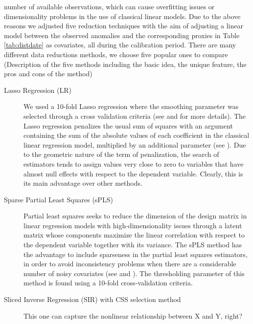 \documentclass[11pt]{amsart}
\theoremstyle{plain}
\theoremstyle{definition}
\theoremstyle{remark}
\begin{document}
number of available observations, which can cause overfitting issues or
dimensionality problems in the use of classical linear models. Due to the above
reasons we adjusted five reduction techniques with the aim of adjusting
a linear model between the observed anomalies and the corresponding proxies in
Table \ref{tab:distdate} as covariates, all during the calibration
period. There are many different data reductions methods, we choose five popular ones to compare (Description of the five methods including the basic idea, the unique feature, the pros and cons of the method)
\begin{description}
\item[Lasso Regression (LR)]
We used a 10-fold Lasso regression where the smoothing parameter was selected
through a cross validation criteria (see \cite{Tibshirani1996} and \cite{Friedman2010} for more details). %
 The Lasso regression penalizes the usual sum of squares with an argument
 containing the sum of the absolute values of each coefficient in the classical
 linear regression model, multiplied by an additional parameter (see \cite{Tibshirani1996}). Due
 to the geometric nature of the term of penalization, the search of estimators
 tends to assign values very close to zero to variables that have almost null
 effects with respect to the dependent variable. Clearly, this is its main advantage
 over other methods.
\item[Sparse Partial Least Squares (sPLS)] 
  Partial least squares seeks to reduce the dimension of the design matrix in
  linear regression models with high-dimensionality issues through a latent matrix
  whose components maximize the linear correlation with respect to the
  dependent variable together with its variance. The sPLS method has the advantage to include sparseness in the partial least squares
  estimators, in order to avoid inconsistency problems when there are a
  considerable number of noisy covariates (see \cite{Chun2010} and \cite{Chung2013}). The
  thresholding parameter of this method is found using a 10-fold cross-validation criteria.    
\item[Sliced Inverse Regression (SIR) with CSS selection method]
This one can capture the nonlinear relationship between X and Y, right?


\end{description}
\end{document}
